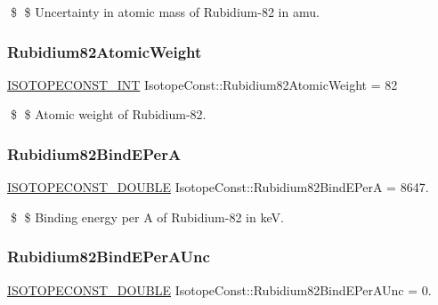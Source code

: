 \$ \$ Uncertainty in atomic mass of Rubidium-\/82 in amu. \mbox{\label{group___isotope_const-_rubidium-_rb82_ga591128ed4a8d7ebb3c60e29c473054dd}} 
\subsubsection{\texorpdfstring{Rubidium82\+Atomic\+Weight}{Rubidium82AtomicWeight}}
{\footnotesize\ttfamily \mbox{\hyperlink{group___isotope_const-_macros_ga5f18360b3e99483a35c32d789e62621c}{I\+S\+O\+T\+O\+P\+E\+C\+O\+N\+S\+T\+\_\+\+I\+NT}} Isotope\+Const\+::\+Rubidium82\+Atomic\+Weight = 82}

\$ \$ Atomic weight of Rubidium-\/82. \mbox{\label{group___isotope_const-_rubidium-_rb82_gabebce11cacd0ee47b38494cdf3fece96}} 
\subsubsection{\texorpdfstring{Rubidium82\+Bind\+E\+PerA}{Rubidium82BindEPerA}}
{\footnotesize\ttfamily \mbox{\hyperlink{group___isotope_const-_macros_ga8f45a7272ce02c0b4c65c44636ed719a}{I\+S\+O\+T\+O\+P\+E\+C\+O\+N\+S\+T\+\_\+\+D\+O\+U\+B\+LE}} Isotope\+Const\+::\+Rubidium82\+Bind\+E\+PerA = 8647.}

\$ \$ Binding energy per A of Rubidium-\/82 in keV. \mbox{\label{group___isotope_const-_rubidium-_rb82_ga780e0e7fdf9253ece51e6f83e6a28d09}} 
\subsubsection{\texorpdfstring{Rubidium82\+Bind\+E\+Per\+A\+Unc}{Rubidium82BindEPerAUnc}}
{\footnotesize\ttfamily \mbox{\hyperlink{group___isotope_const-_macros_ga8f45a7272ce02c0b4c65c44636ed719a}{I\+S\+O\+T\+O\+P\+E\+C\+O\+N\+S\+T\+\_\+\+D\+O\+U\+B\+LE}} Isotope\+Const\+::\+Rubidium82\+Bind\+E\+Per\+A\+Unc = 0.}

